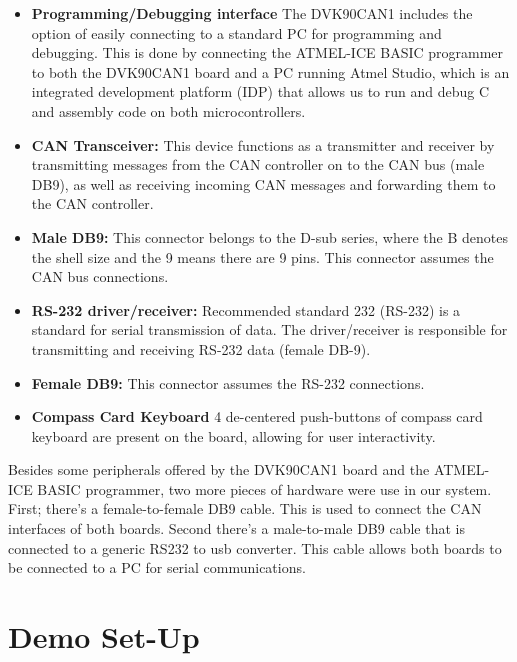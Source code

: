 \begin{itemize}
	\item \textbf{Programming/Debugging interface} The DVK90CAN1 includes the option of easily connecting to a standard PC for programming and debugging. This is done by connecting the ATMEL-ICE BASIC programmer to both the DVK90CAN1 board and a PC running Atmel Studio, which is an integrated development platform (IDP) that allows us to run and debug C and assembly code on both microcontrollers.
	
	\item \textbf{CAN Transceiver:} This device functions as a transmitter and receiver by transmitting messages from the CAN controller on to the CAN bus (male DB9), as well as receiving incoming CAN messages and forwarding them to the CAN controller. 
	
	\item \textbf{Male DB9:} This connector belongs to the D-sub series, where the B denotes the shell size and the 9 means there are 9 pins. This connector assumes the CAN bus connections.
	
	\item \textbf{RS-232 driver/receiver:} Recommended standard 232 (RS-232) is a standard for serial transmission of data. The driver/receiver is responsible for transmitting and receiving RS-232 data (female DB-9).
	
	\item \textbf{Female DB9:} This connector assumes the RS-232 connections.
	
	\item \textbf{Compass Card Keyboard} 4 de-centered push-buttons of compass card keyboard are present on the board, allowing for user interactivity.
\end{itemize}
Besides some peripherals offered by the DVK90CAN1 board and the ATMEL-ICE BASIC programmer, two more pieces of hardware were use in our system. First; there's a female-to-female DB9 cable. This is used to connect the CAN interfaces of both boards. Second there's a male-to-male DB9 cable that is connected to a generic RS232 to usb converter. This cable allows both boards to be connected to a PC for serial communications.

\section{Demo Set-Up}
\label{sec:demo_setup}

